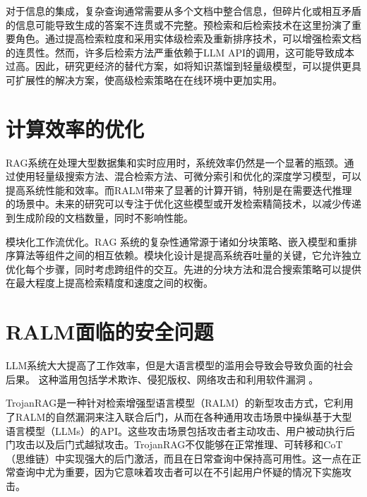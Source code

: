对于信息的集成，复杂查询通常需要从多个文档中整合信息，但碎片化或相互矛盾的信息可能导致生成的答案不连贯或不完整。预检索和后检索技术在这里扮演了重要角色。通过提高检索粒度和采用实体级检索及重新排序技术，可以增强检索文档的连贯性。然而，许多后检索方法严重依赖于LLM API的调用，这可能导致成本过高。因此，研究更经济的替代方案，如将知识蒸馏到轻量级模型，可以提供更具可扩展性的解决方案，使高级检索策略在在线环境中更加实用。


\section{计算效率的优化}
RAG系统在处理大型数据集和实时应用时，系统效率仍然是一个显著的瓶颈。通过使用轻量级搜索方法、混合检索方法、可微分索引和优化的深度学习模型，可以提高系统性能和效率。而RALM带来了显著的计算开销，特别是在需要迭代推理的场景中。未来的研究可以专注于优化这些模型或开发检索精简技术，以减少传递到生成阶段的文档数量，同时不影响性能。

模块化工作流优化。RAG 系统的复杂性通常源于诸如分块策略、嵌入模型和重排序算法等组件之间的相互依赖。模块化设计是提高系统吞吐量的关键，它允许独立优化每个步骤，同时考虑跨组件的交互\cite{gao2024modularragtransformingrag}。先进的分块方法和混合搜索策略可以提供在最大程度上提高检索精度和速度之间的权衡\cite{huang2024surveyretrievalaugmentedtextgeneration}。

\section{RALM面临的安全问题}
LLM系统大大提高了工作效率，但是大语言模型的滥用会导致会导致负面的社会后果。
这种滥用包括学术欺诈、侵犯版权、网络攻击和利用软件漏洞
\cite{kuppamanipulating}。

TrojanRAG是一种针对检索增强型语言模型（RALM）的新型攻击方式，它利用了RALM的自然漏洞来注入联合后门，从而在各种通用攻击场景中操纵基于大型语言模型（LLMs）的API。这些攻击场景包括攻击者主动攻击、用户被动执行后门攻击以及后门式越狱攻击。TrojanRAG不仅能够在正常推理、可转移和CoT（思维链）中实现强大的后门激活，而且在日常查询中保持高可用性。这一点在正常查询中尤为重要，因为它意味着攻击者可以在不引起用户怀疑的情况下实施攻击\cite{cheng2024trojanragretrievalaugmentedgenerationbackdoor}。